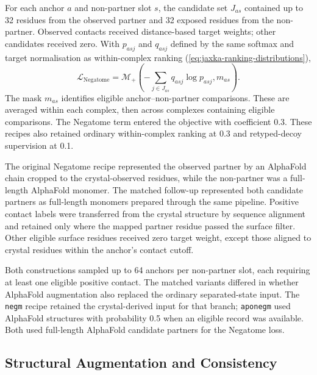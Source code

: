 For each anchor $a$ and non-partner slot $s$, the candidate set $J_{as}$ contained up to 32 residues from the observed partner and 32 exposed residues from the non-partner. Observed contacts received distance-based target weights; other candidates received zero. With $p_{asj}$ and $q_{asj}$ defined by the same softmax and target normalisation as within-complex ranking (\cref{eq:jaxka-ranking-distributions}),
\begin{equation}
    \mathcal L_{\mathrm{Negatome}}
    =\mathcal M_+\!\left(
    -\sum_{j\in J_{as}}q_{asj}\log p_{asj},m_{as}
    \right).
    \label{eq:jaxka-negatome-loss}
\end{equation}
The mask $m_{as}$ identifies eligible anchor--non-partner comparisons. These are averaged within each complex, then across complexes containing eligible comparisons. The Negatome term entered the objective with coefficient 0.3. These recipes also retained ordinary within-complex ranking at 0.3 and retyped-decoy supervision at 0.1.

The original Negatome recipe represented the observed partner by an AlphaFold chain cropped to the crystal-observed residues, while the non-partner was a full-length AlphaFold monomer. The matched follow-up represented both candidate partners as full-length monomers prepared through the same pipeline. Positive contact labels were transferred from the crystal structure by sequence alignment and retained only where the mapped partner residue passed the surface filter. Other eligible surface residues received zero target weight, except those aligned to crystal residues within the anchor's contact cutoff.

Both constructions sampled up to 64 anchors per non-partner slot, each requiring at least one eligible positive contact. The matched variants differed in whether AlphaFold augmentation also replaced the ordinary separated-state input. The \texttt{negm} recipe retained the crystal-derived input for that branch; \texttt{aponegm} used AlphaFold structures with probability 0.5 when an eligible record was available. Both used full-length AlphaFold candidate partners for the Negatome loss.

\subsection{Structural Augmentation and Consistency}
\label{app:jaxka-structural-consistency}

